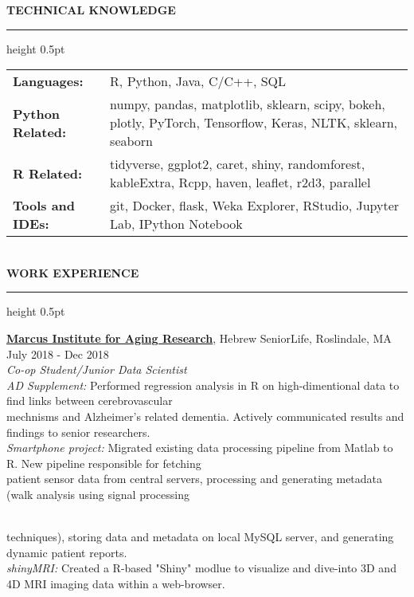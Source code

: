 \documentclass[a4paper]{article}
\newcommand{\myline}{\par
  \kern2pt %
  \hrule height 0.5pt
  \kern2pt %
}
\newcommand{\mybullet}{
	\indent \textbullet \hspace*{2mm}
}
\newcommand{\linetab}{
  \\ \hspace*{9mm}
}
\begin{document}
	\noindent
	{\large \textbf{TECHNICAL KNOWLEDGE}}
	\myline 
	
	\noindent
	\begin{tabular}{ m{3cm} l }
		\textbf{Languages: } & R, Python, Java, C/C++, SQL \\ 
    \textbf{Python Related: } & numpy, pandas, matplotlib, sklearn, scipy, bokeh, plotly, PyTorch, 
    Tensorflow, Keras, NLTK, sklearn, seaborn \\ 
    \textbf{R Related: } & tidyverse, ggplot2, caret, shiny, randomforest, kableExtra, Rcpp, 
    haven, leaflet, r2d3, parallel \\
		\textbf{Tools and IDEs: } & git, Docker, flask, Weka Explorer, RStudio, 
                Jupyter Lab, IPython Notebook\\
	\end{tabular} \\

	\smallskip
	\smallskip
	\noindent
	{\large \textbf{WORK EXPERIENCE}}
	\myline 
	\smallskip
	
  \noindent
  \textbf{\href{https://www.marcusinstituteforaging.org/}{Marcus Institute for Aging Research}}, 
  Hebrew SeniorLife, Roslindale, MA 
  \hfill July 2018 - Dec 2018\\
        \textit{Co-op Student/Junior Data Scientist} \\
        \mybullet \textit{AD Supplement:} Performed regression analysis in R on high-dimentional 
        data to find links between cerebrovascular  \\ \hspace*{9mm} mechnisms 
        and Alzheimer's related dementia. Actively communicated results and findings to senior
        researchers. \\
        \mybullet \textit{Smartphone project:} Migrated existing data processing pipeline from 
        Matlab to R. New pipeline responsible for fetching \linetab patient sensor data from 
        central servers, processing and generating metadata (walk analysis using signal processing 
        \linetab techniques), storing data and metadata on local MySQL server, and generating 
        dynamic patient reports. \\
        \mybullet \textit{shinyMRI: } Created a R-based "Shiny" modlue to visualize and dive-into 
        3D and 4D MRI imaging data within a web-browser. \\
        
\end{document}
